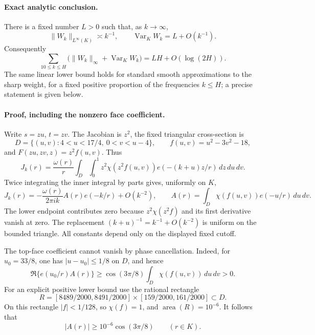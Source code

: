 \paragraph{Exact analytic conclusion.}
There is a fixed number $L>0$ such that, as $k\to\infty$,
\begin{equation}\label{B:compensated-norm}
 \|W_k\|_{L^\infty(K)}\asymp k^{-1},\qquad
 \operatorname{Var}_K W_k=L+O(k^{-1}).
\end{equation}
Consequently
\[
 \sum_{10\leq k\leq H}
 \bigl(\|W_k\|_\infty+\operatorname{Var}_K W_k\bigr)
 =LH+O(\log(2H)).
\]
The same linear lower bound holds for standard smooth approximations
to the sharp weight, for a fixed positive proportion of the frequencies
$k\leq H$; a precise statement is given below.

\paragraph{Proof, including the nonzero face coefficient.}
Write $s=zu$, $t=zv$.  The Jacobian is $z^2$, the fixed triangular
cross-section is
\[
 D=\{(u,v):4<u<17/4,\ 0<v<u-4\},\qquad
 f(u,v)=u^2-3v^2-18,
\]
and $F(zu,zv,z)=z^2f(u,v)$.  Thus
\[
 J_k(r)=\frac{\omega(r)}r
 \int_D\int_0^1 z^2\chi(z^2f(u,v))
               e(-(k+u)z/r)\,dz\,du\,dv.
\]
Twice integrating the inner integral by parts gives, uniformly on $K$,
\begin{equation}\label{B:compensated-leading}
 J_k(r)=-\frac{\omega(r)}{2\pi i k}A(r)e(-k/r)+O(k^{-2}),
 \qquad
 A(r)=\int_D\chi(f(u,v))e(-u/r)\,du\,dv.
\end{equation}
The lower endpoint contributes zero because $z^2\chi(z^2f)$ and its
first derivative vanish at zero.  The replacement
$(k+u)^{-1}=k^{-1}+O(k^{-2})$ is uniform on the bounded triangle.
All constants depend only on the displayed fixed cutoff.

The top-face coefficient cannot vanish by phase cancellation.  Indeed,
for $u_0=33/8$, one has $|u-u_0|\leq1/8$ on $D$, and hence
\[
 \Re\{e(u_0/r)A(r)\}
 \geq \cos(3\pi/8)\int_D\chi(f(u,v))\,du\,dv>0.
\]
For an explicit positive lower bound use the rational rectangle
\[
 R=[8489/2000,8491/2000]\times[159/2000,161/2000]\subset D.
\]
On this rectangle $|f|<1/128$, so $\chi(f)=1$, and
$\operatorname{area}(R)=10^{-6}$.  It follows that
\begin{equation}\label{B:compensated-A-positive}
 |A(r)|\geq10^{-6}\cos(3\pi/8)\qquad(r\in K).
\end{equation}

